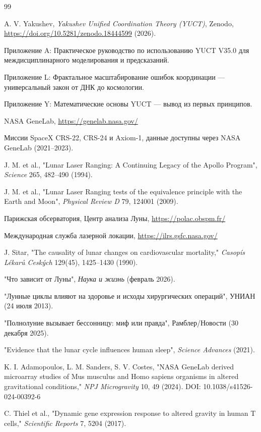 \documentclass[12pt,a4paper]{article}
\theoremstyle{remark}
\begin{document}
	\begin{thebibliography}{99}
		
		A. V. Yakushev, \emph{Yakushev Unified Coordination Theory (YUCT)}, Zenodo, \url{https://doi.org/10.5281/zenodo.18444599} (2026).
		
		Приложение A: Практическое руководство по использованию YUCT V35.0 для междисциплинарного моделирования и предсказаний.
		
		Приложение L: Фрактальное масштабирование ошибок координации — универсальный закон от ДНК до космологии.
		
		Приложение Y: Математические основы YUCT — вывод из первых принципов.
		
		NASA GeneLab, \url{https://genelab.nasa.gov/}
		
		Миссии SpaceX CRS-22, CRS-24 и Axiom-1, данные доступны через NASA GeneLab (2021–2023).
		
		J. M. et al., "Lunar Laser Ranging: A Continuing Legacy of the Apollo Program", \emph{Science} 265, 482–490 (1994).
		
		J. M. et al., "Lunar Laser Ranging tests of the equivalence principle with the Earth and Moon", \emph{Physical Review D} 79, 124001 (2009).
		
		Парижская обсерватория, Центр анализа Луны, \url{https://polac.obspm.fr/}
		
		Международная служба лазерной локации, \url{https://ilrs.gsfc.nasa.gov/}
		
		J. Sitar, "The causality of lunar changes on cardiovascular mortality," \emph{Casopís Lékarů Ceských} 129(45), 1425–1430 (1990).
		
		"Что зависит от Луны", \emph{Наука и жизнь} (февраль 2026).
		
		"Лунные циклы влияют на здоровье и исходы хирургических операций", УНИАН (24 июля 2013).
		
		"Полнолуние вызывает бессонницу: миф или правда", Рамблер/Новости (30 декабря 2025).
		
		"Evidence that the lunar cycle influences human sleep", \emph{Science Advances} (2021).
		
		K. I. Adamopoulos, L. M. Sanders, S. V. Costes, "NASA GeneLab derived microarray studies of Mus musculus and Homo sapiens organisms in altered gravitational conditions," \emph{NPJ Microgravity} 10, 49 (2024). DOI: 10.1038/s41526-024-00392-6
		
		C. Thiel et al., "Dynamic gene expression response to altered gravity in human T cells," \emph{Scientific Reports} 7, 5204 (2017).
		
	\end{thebibliography}
	
\end{document}
